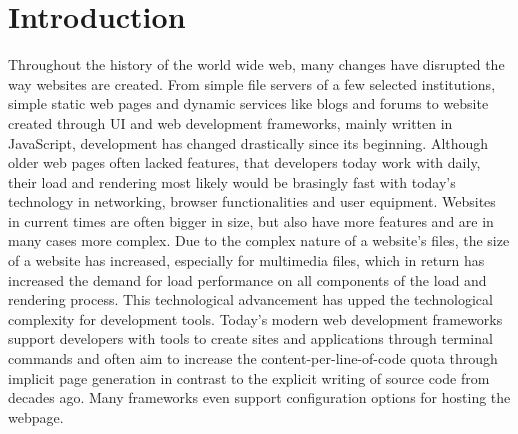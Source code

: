 \documentclass[a4paper, fontsize=11pt]{article}
\begin{document}
\section{Introduction}\label{sec:introduction}
Throughout the history of the world wide web, many changes have disrupted the way websites are created.
From simple file servers of a few selected institutions, simple static web pages and dynamic services like blogs and forums to website created through UI and web development frameworks, mainly written in JavaScript, development has changed drastically since its beginning.
Although older web pages often lacked features, that developers today work with daily, their load and rendering most likely would be brasingly fast with today's technology in networking, browser functionalities and user equipment.
Websites in current times are often bigger in size, but also have more features and are in many cases more complex.
Due to the complex nature of a website's files, the size of a website has increased, especially for multimedia files, which in return has increased the demand for load performance on all components of the load and rendering process.
This technological advancement has upped the technological complexity for development tools.
Today's modern web development frameworks support developers with tools to create sites and applications through terminal commands and often aim to increase the content-per-line-of-code quota through implicit page generation in contrast to the explicit writing of source code from decades ago.
Many frameworks even support configuration options for hosting the webpage.
\end{document}
